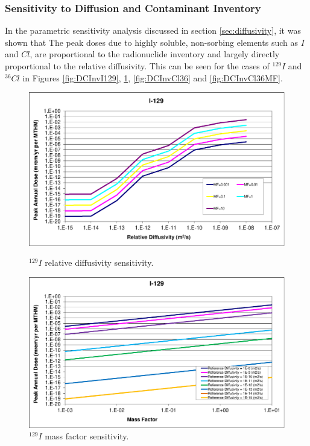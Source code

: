 
\subsubsection{Sensitivity to Diffusion and Contaminant Inventory}

In the parametric sensitivity analysis discussed in section
\ref{sec:diffusivity}, it was shown that
The peak doses due to highly soluble, non-sorbing elements such as $I$ and $Cl$, 
are  proportional to the radionuclide inventory and 
largely directly proportional to the relative diffusivity. This can be seen for 
the cases of $^{129}I$ and $^{36}Cl$ in Figures \ref{fig:DCInvI129}, 
\ref{fig:DCInvI129MF}, \ref{fig:DCInvCl36} and \ref{fig:DCInvCl36MF}.

\begin{figure}[ht]
\centering
\begin{minipage}[b]{0.45\linewidth}

\includegraphics[width=\linewidth]{./chapters/nuclide_sensitivity/clay/DiffCoeffAndInvEBSFail/I-129.eps}
\caption{$^{129}I$ relative diffusivity sensitivity.}
\label{fig:DCInvI129}

\end{minipage}
\hspace{0.05\linewidth}
\begin{minipage}[b]{0.45\linewidth}

\includegraphics[width=\linewidth]{./chapters/nuclide_sensitivity/clay/DiffCoeffAndInvEBSFail/I-129-MF.eps}
\caption{$^{129}I$ mass factor sensitivity.}
\label{fig:DCInvI129MF}

\end{minipage}
\end{figure}


